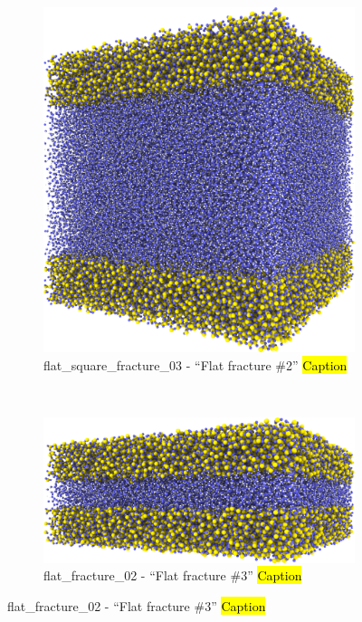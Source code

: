 \begin{figure}[htpb]
\begin{subfigure}[b]{\myfigwidth}
        \includegraphics[width=\textwidth]{images/systems/trimmed-flat_square_fracture03_04}%
        \caption{%
            flat\_square\_fracture\_03 - ``Flat fracture \#2'' \hl{Caption} %
        }%
        \label{fig:renderings_flat_square_fracture03}%
    \end{subfigure}%
    \\%
    \begin{subfigure}[b]{\myfigwidth}%
        \centering%
        \includegraphics[width=\textwidth]{images/systems/trimmed-flat_fracture02_03}%
        \caption{%
            flat\_fracture\_02 - ``Flat fracture \#3'' \hl{Caption} %
}
\end{subfigure}
\end{figure}
